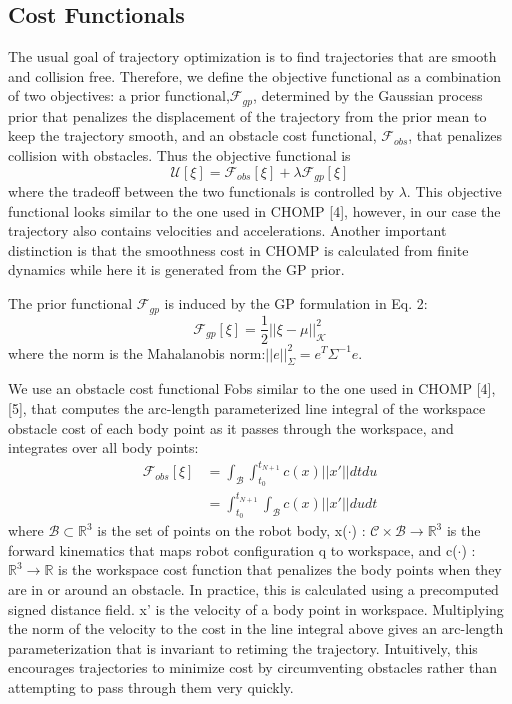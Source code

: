 \documentclass{IEEEtran}
\begin{document}
\subsection{Cost Functionals}
The usual goal of trajectory optimization is to find trajectories that are smooth and collision free. Therefore, we define
the objective functional as a combination of two objectives:
a prior functional,$\mathcal{F}_{gp}$, determined by the Gaussian process
prior that penalizes the displacement of the trajectory from
the prior mean to keep the trajectory smooth, and an obstacle
cost functional, $\mathcal{F}_{obs}$, that penalizes collision with obstacles.
Thus the objective functional is
\begin{equation*}
\mathcal{U}[\xi]=\mathcal{F}_{obs}[\xi]+\lambda\mathcal{F}_{gp}[\xi]\tag{18}
\end{equation*}
where the tradeoff between the two functionals is controlled
by $\lambda$. This objective functional looks similar to the one used
in CHOMP [4], however, in our case the trajectory also
contains velocities and accelerations. Another important distinction is that the smoothness cost in CHOMP is calculated
from finite dynamics while here it is generated from the GP
prior.

The prior functional $\mathcal{F}_{gp}$ is induced by the GP formulation
in Eq. 2:
\begin{equation*}
\mathcal{F}_{gp}[\xi]=\frac{1}{2}||\xi-\mu||_{\mathcal{K}}^2\tag{19}
\end{equation*}
where the norm is the Mahalanobis norm:$||e||_\Sigma^2=e^T\Sigma^{-1}e$.

We use an obstacle cost functional Fobs similar to the
one used in CHOMP [4], [5], that computes the arc-length
parameterized line integral of the workspace obstacle cost
of each body point as it passes through the workspace, and
integrates over all body points:
\begin{equation}
\begin{split}
\mathcal{F}_{obs}[\xi]&=\int_\mathcal{B}^{}\int_{t_0}^{t_{N+1}}c(x)||x'||dtdu\\
&=\int_{t_0}^{t_{N+1}}\int_\mathcal{B}^{}c(x)||x'||dudt
\end{split}
\tag{20}
\end{equation}
where $\mathcal{B} \subset \mathbb{R}^3$
is the set of points on the robot body,
x($\cdot$) : $\mathcal{C} \times \mathcal{B} \rightarrow \mathbb{R}^3$
is the forward kinematics that maps
robot configuration q to workspace, and c($\cdot$) :$ \mathbb{R}^3\rightarrow
 \mathbb{R}$ is the workspace cost function that penalizes the body points
when they are in or around an obstacle. In practice, this is
calculated using a precomputed signed distance field. x'
is
the velocity of a body point in workspace. Multiplying the
norm of the velocity to the cost in the line integral above
gives an arc-length parameterization that is invariant to retiming the trajectory. Intuitively, this encourages trajectories
to minimize cost by circumventing obstacles rather than
attempting to pass through them very quickly.
\end{document}
